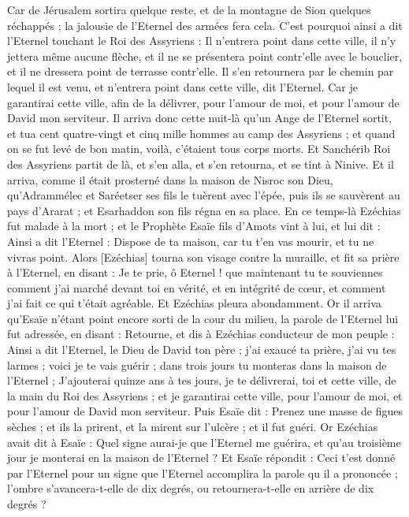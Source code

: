 \begin{multicols}{2}
Car de Jérusalem sortira quelque reste, et de la montagne de Sion quelques réchappés ; la jalousie de l'Eternel des armées fera cela.
C'est pourquoi ainsi a dit l'Eternel touchant le Roi des Assyriens : Il n'entrera point dans cette ville, il n'y jettera même aucune flèche, et il ne se présentera point contr'elle avec le bouclier, et il ne dressera point de terrasse contr'elle.
Il s'en retournera par le chemin par lequel il est venu, et n'entrera point dans cette ville, dit l'Eternel.
Car je garantirai cette ville, afin de la délivrer, pour l'amour de moi, et pour l'amour de David mon serviteur.
Il arriva donc cette nuit-là qu'un Ange de l'Eternel sortit, et tua cent quatre-vingt et cinq mille hommes au camp des Assyriens ; et quand on se fut levé de bon matin, voilà, c'étaient tous corps morts.
Et Sanchérib Roi des Assyriens partit de là, et s'en alla, et s'en retourna, et se tint à Ninive.
Et il arriva, comme il était prosterné dans la maison de Nisroc son Dieu, qu'Adrammélec et Saréetser ses fils le tuèrent avec l'épée, puis ils se sauvèrent au pays d'Ararat ; et Esarhaddon son fils régna en sa place.
\VerseOne{}En ce temps-là Ezéchias fut malade à la mort ; et le Prophète Esaïe fils d'Amots vint à lui, et lui dit : Ainsi a dit l'Eternel : Dispose de ta maison, car tu t'en vas mourir, et tu ne vivras point.
Alors [Ezéchias] tourna son visage contre la muraille, et fit sa prière à l'Eternel, en disant :
Je te prie, ô Eternel ! que maintenant tu te souviennes comment j'ai marché devant toi en vérité, et en intégrité de cœur, et comment j'ai fait ce qui t'était agréable. Et Ezéchias pleura abondamment.
Or il arriva qu'Esaïe n'étant point encore sorti de la cour du milieu, la parole de l'Eternel lui fut adressée, en disant :
Retourne, et dis à Ezéchias conducteur de mon peuple : Ainsi a dit l'Eternel, le Dieu de David ton père ; j'ai exaucé ta prière, j'ai vu tes larmes ; voici je te vais guérir ; dans trois jours tu monteras dans la maison de l'Eternel ;
J'ajouterai quinze ans à tes jours, je te délivrerai, toi et cette ville, de la main du Roi des Assyriens ; et je garantirai cette ville, pour l'amour de moi, et pour l'amour de David mon serviteur.
Puis Esaïe dit : Prenez une masse de figues sèches ; et ils la prirent, et la mirent sur l'ulcère ; et il fut guéri.
Or Ezéchias avait dit à Esaïe : Quel signe aurai-je que l'Eternel me guérira, et qu'au troisième jour je monterai en la maison de l'Eternel ?
Et Esaïe répondit : Ceci t'est donné par l'Eternel pour un signe que l'Eternel accomplira la parole qu il a prononcée ; l'ombre s'avancera-t-elle de dix degrés, ou retournera-t-elle en arrière de dix degrés ?

\end{multicols}
